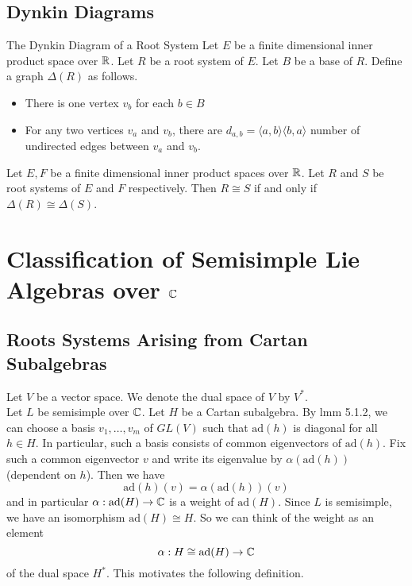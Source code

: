 \documentclass[a4paper]{article}
\begin{document}
\subsection{Dynkin Diagrams}
\begin{defn}{The Dynkin Diagram of a Root System}{} Let $E$ be a finite dimensional inner product space over $\mathbb{R}$. Let $R$ be a root system of $E$. Let $B$ be a base of $R$. Define a graph $\Delta(R)$ as follows. 
\begin{itemize}
\item There is one vertex $v_b$ for each $b\in B$
\item For any two vertices $v_a$ and $v_b$, there are $d_{a,b}=\langle a,b\rangle\langle b,a\rangle$ number of undirected edges between $v_a$ and $v_b$. 
\end{itemize}
\end{defn}

\begin{prp}{}{} Let $E,F$ be a finite dimensional inner product spaces over $\mathbb{R}$. Let $R$ and $S$ be root systems of $E$ and $F$ respectively. Then $R\cong S$ if and only if $\Delta(R)\cong\Delta(S)$. 
\end{prp}

\pagebreak
\section{Classification of Semisimple Lie Algebras over $\mathbb{C}$}
\subsection{Roots Systems Arising from Cartan Subalgebras}
Let $V$ be a vector space. We denote the dual space of $V$ by $V^\ast$. \\

Let $L$ be semisimple over $\mathbb{C}$. Let $H$ be a Cartan subalgebra. By lmm 5.1.2, we can choose a basis $v_1,\dots,v_m$ of $GL(V)$ such that $\text{ad}(h)$ is diagonal for all $h\in H$. In particular, such a basis consists of common eigenvectors of $\text{ad}(h)$. Fix such a common eigenvector $v$ and write its eigenvalue by $\alpha(\text{ad}(h))$ (dependent on $h$). Then we have $$\text{ad}(h)(v)=\alpha(\text{ad}(h))(v)$$ and in particular $\alpha:\text{ad}(H)\to\mathbb{C}$ is a weight of $\text{ad}(H)$. Since $L$ is semisimple, we have an isomorphism $\text{ad}(H)\cong H$. So we can think of the weight as an element $$\alpha:H\cong\text{ad}(H)\to\mathbb{C}$$ of the dual space $H^\ast$. This motivates the following definition. 
\end{document}
